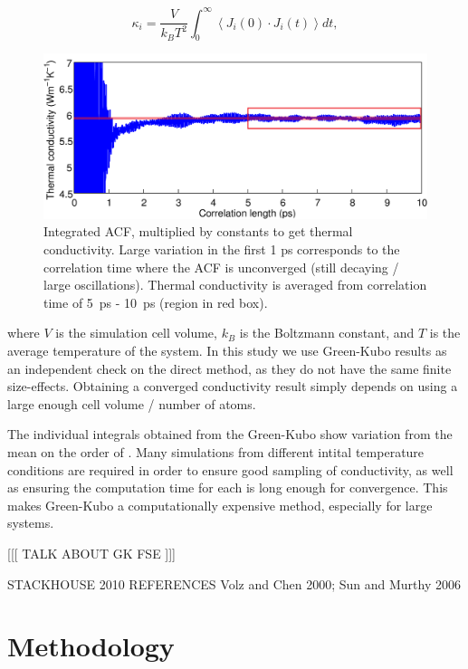 \documentclass[%
preprint,                                  %
nofootinbib,
 amsmath,amssymb,
 aps,
]{revtex4-1}
\begin{document}
\begin{equation}
\kappa_i = \frac{V}{k_{B}T^2} \int_{0}^{\infty} \left \langle J_i(0) \cdot  J_i(t) \right \rangle dt ,
\label{gk-int}
\end{equation}
\begin{figure}[h]
  \includegraphics[width=\linewidth]{images/gk_int.png}
  \caption{Integrated ACF, multiplied by constants to get thermal conductivity. Large variation in the first 1 ps corresponds to the correlation time where the ACF is unconverged (still decaying / large oscillations). Thermal conductivity is averaged from correlation time of 5~ps - 10~ps (region in red box).}
  \label{fig:gk_int}
\end{figure}
where $V$ is the simulation cell volume, $k_B$ is the Boltzmann constant, and $T$ is the average temperature of the system. In this study we use Green-Kubo results as an independent check on the direct method, as they do not have the same finite size-effects. Obtaining a converged conductivity result simply depends on using a large enough cell volume / number of atoms. 

The individual integrals obtained from the Green-Kubo show variation from the mean on the order of \wmk. Many simulations from different intital temperature conditions are required in order to ensure good sampling of conductivity, as well as ensuring the computation time for each is long enough for convergence. This makes Green-Kubo a computationally expensive method, especially for large systems.

[[[ TALK ABOUT GK FSE ]]]

STACKHOUSE 2010 REFERENCES Volz and Chen 2000; Sun and Murthy 2006





\section{\label{sec:methodology}Methodology}
\end{document}
